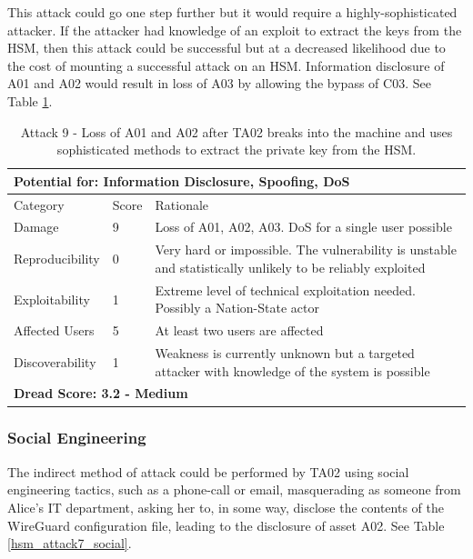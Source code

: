 \documentclass [11pt, proquest] {uwthesis}[2020/02/24]
\begin{document}
This attack could go one step further but it would require a highly-sophisticated attacker. If the attacker had knowledge of an exploit to extract the keys from the HSM, then this attack could be successful but at a decreased likelihood due to the cost of mounting a successful attack on an HSM. Information disclosure of A01 and A02 would result in loss of A03 by allowing the bypass of C03. 
See Table \ref{hsm_attack9_extract}.
\begin{table}[H]
\begin{tabular}{|m{3cm}|m{1cm}|p{27em} |}
\multicolumn{3}{l}{Potential for: Information Disclosure, Spoofing, DoS}                   \\
\hline
Category & Score & Rationale \\
\hline
Damage          & 9     & Loss of A01, A02, A03. DoS for a single user possible            \\
\hline
Reproducibility & 0     & Very hard or impossible. The vulnerability is unstable and statistically unlikely to be reliably exploited   \\
\hline
Exploitability & 1      & Extreme level of technical exploitation needed. Possibly a Nation-State actor   \\
\hline
Affected Users  & 5     & At least two users are affected                      \\
\hline
Discoverability & 1     & Weakness is currently unknown but a targeted attacker with knowledge of the system is possible   \\
\hline
\multicolumn{3}{l}{\textbf{Dread Score: 3.2 - Medium}} 
\end{tabular}
\caption{Attack 9 - Loss of A01 and A02 after TA02 breaks into the machine and uses sophisticated methods to extract the private key from the HSM.}
\label{hsm_attack9_extract}
\end{table}

\subsubsection{Social Engineering}
The indirect method of attack could be performed by TA02 using social engineering tactics, such as a phone-call or email, masquerading as someone from Alice's IT department, asking her to, in some way, disclose the contents of the WireGuard configuration file, leading to the disclosure of asset A02.
See Table \ref{hsm_attack7_social}.
\end{document}
